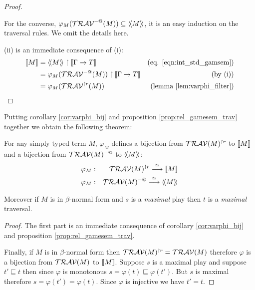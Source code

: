 \begin{proof}
\begin{itemize}
  For the converse, $\varphi_{M}( \mathcal{TRAV}^{-@}(M) ) \subseteq {\langle\!\langle M \rangle\!\rangle}$, it is an easy induction
  on the traversal rules. We omit the details here.
\end{itemize}

(ii) is an immediate consequence of (i):
\begin{align*}
\sem{M} &= \intersem{M} \upharpoonright \sem{\Gamma \rightarrow T} & \mbox{(eq. \ref{eqn:int_std_gamsem})} \\
        &= \varphi_M(\travset^{-@}(M)) \upharpoonright \sem{\Gamma \rightarrow T} & \mbox{(by (i))}\\
        &= \varphi_M(\travset^{\upharpoonright r}(M)) & \mbox{(lemma \ref{lem:varphi_filter})}\\
\end{align*}
\end{proof}


Putting corollary \ref{cor:varphi_bij} and proposition
\ref{prop:rel_gamesem_trav} together we obtain the following
theorem:

\begin{thm}
For any simply-typed term $M$, $\varphi_M$ defines a bijection from
$\mathcal{TRAV}(M)^{\upharpoonright r}$ to ${[\![ M ]\!]}$ and a bijection
from $\mathcal{TRAV}(M)^{-@}$ to ${\langle\!\langle M \rangle\!\rangle}$:
\begin{eqnarray*}
 \varphi_M  &:& \mathcal{TRAV}(M)^{\upharpoonright r} \stackrel{\cong}{\longrightarrow} {[\![ M ]\!]} \\
 \varphi_M  &:& \mathcal{TRAV}(M)^{-@} \stackrel{\cong}{\longrightarrow} {\langle\!\langle M \rangle\!\rangle}
\end{eqnarray*}

Moreover if $M$ is in $\beta$-normal form and $s$ is a
\emph{maximal} play then  $t$ is a \emph{maximal} traversal.
\end{thm}

\begin{proof}
The first part is an immediate consequence of corollary
\ref{cor:varphi_bij} and proposition
\ref{prop:rel_gamesem_trav}.

Finally, if $M$ is in $\beta$-normal form then
$\mathcal{TRAV}(M)^{\upharpoonright r} = \mathcal{TRAV}(M)$
therefore $\varphi$ is a bijection from $\mathcal{TRAV}(M)$ to
${[\![ M ]\!]}$. Suppose $s$ is a maximal play and suppose $t' \sqsubseteq
t$ then since $\varphi$ is monotonous $s = \varphi(t) \sqsubseteq
\varphi(t')$. But $s$ is maximal therefore $s = \varphi(t') =
\varphi(t)$. Since $\varphi$ is injective we have $t'=t$.
\end{proof}

